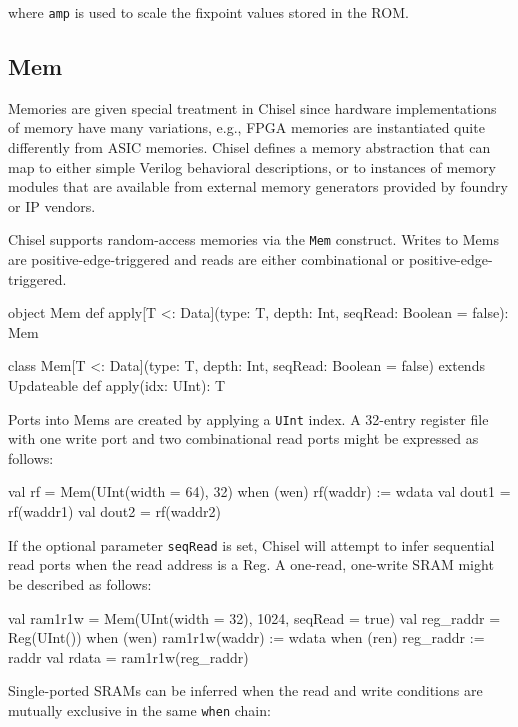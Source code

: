 \documentclass[twocolumn,10pt]{article}
\def\code#1{{\tt #1}}
\begin{document}
\noindent
where \verb+amp+ is used to scale the fixpoint values stored in the ROM.

\subsection{Mem}

Memories are given special treatment in Chisel since hardware
implementations of memory have many variations, e.g., FPGA memories
are instantiated quite differently from ASIC memories.  Chisel defines
a memory abstraction that can map to either simple Verilog behavioral
descriptions, or to instances of memory modules that are available
from external memory generators provided by foundry or IP vendors.  

Chisel supports random-access memories via the \code{Mem} construct.
Writes to Mems are positive-edge-triggered and reads are either
combinational or positive-edge-triggered.

\begin{scala}
object Mem {
  def apply[T <: Data](type: T, depth: Int, 
          seqRead: Boolean = false): Mem
}

class Mem[T <: Data](type: T, depth: Int,
      seqRead: Boolean = false)
    extends Updateable {
  def apply(idx: UInt): T
}
\end{scala}

Ports into Mems are created by applying a \code{UInt} index.  A 32-entry
register file with one write port and two combinational read ports might be
expressed as follows:

\begin{scala}
val rf = Mem(UInt(width = 64), 32)
when (wen) { rf(waddr) := wdata }
val dout1 = rf(waddr1)
val dout2 = rf(waddr2)
\end{scala}

If the optional parameter \code{seqRead} is set, Chisel will attempt to infer
sequential read ports when the read address is a Reg.  A one-read,
one-write SRAM might be described as follows:

\begin{scala}
val ram1r1w =
  Mem(UInt(width = 32), 1024, seqRead = true)
val reg_raddr = Reg(UInt())
when (wen) { ram1r1w(waddr) := wdata }
when (ren) { reg_raddr := raddr }
val rdata = ram1r1w(reg_raddr)
\end{scala}

Single-ported SRAMs can be inferred when the read and write conditions are
mutually exclusive in the same \code{when} chain:
\end{document}
